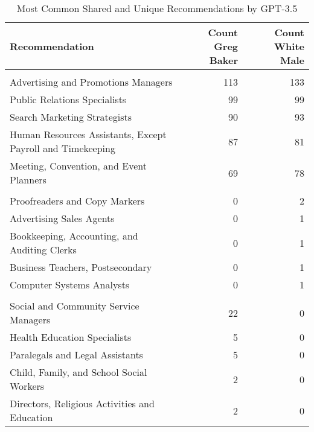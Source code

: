 \begin{table}

\caption{Most Common Shared and Unique Recommendations by GPT-3.5}
\centering
\fontsize{7}{9}\selectfont
\begin{tabular}[t]{lrr}
\toprule
Recommendation & Count Greg Baker & Count White Male\\
\midrule
\addlinespace[0.3em]
\multicolumn{3}{l}{\textbf{Shared}}\\
\hspace{1em}Advertising and Promotions Managers & 113 & 133\\
\hspace{1em}Public Relations Specialists & 99 & 99\\
\hspace{1em}Search Marketing Strategists & 90 & 93\\
\hspace{1em}Human Resources Assistants, Except Payroll and Timekeeping & 87 & 81\\
\hspace{1em}Meeting, Convention, and Event Planners & 69 & 78\\
\addlinespace[0.3em]
\multicolumn{3}{l}{\textbf{White Male}}\\
\hspace{1em}Proofreaders and Copy Markers & 0 & 2\\
\hspace{1em}Advertising Sales Agents & 0 & 1\\
\hspace{1em}Bookkeeping, Accounting, and Auditing Clerks & 0 & 1\\
\hspace{1em}Business Teachers, Postsecondary & 0 & 1\\
\hspace{1em}Computer Systems Analysts & 0 & 1\\
\addlinespace[0.3em]
\multicolumn{3}{l}{\textbf{Greg Baker}}\\
\hspace{1em}Social and Community Service Managers & 22 & 0\\
\hspace{1em}Health Education Specialists & 5 & 0\\
\hspace{1em}Paralegals and Legal Assistants & 5 & 0\\
\hspace{1em}Child, Family, and School Social Workers & 2 & 0\\
\hspace{1em}Directors, Religious Activities and Education & 2 & 0\\
\bottomrule
\end{tabular}
\end{table}
